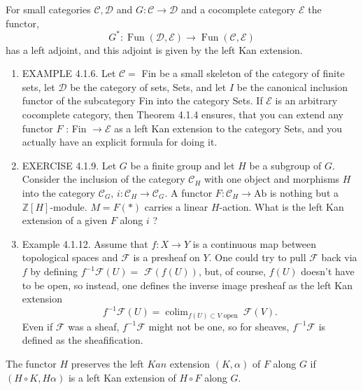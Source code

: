 \begin{example}
\begin{theo}
For small categories $\mathcal{C}, \mathcal{D}$ and $G: \mathcal{C} \rightarrow \mathcal{D}$ and a cocomplete category $\mathcal{E}$ the functor,
$$
G^*: \operatorname{Fun}(\mathcal{D}, \mathcal{E}) \rightarrow \operatorname{Fun}(\mathcal{C}, \mathcal{E})
$$
has a left adjoint, and this adjoint is given by the left Kan extension.
\end{theo}

\begin{example}
    \begin{enumerate}
        \item EXAMPLE 4.1.6. Let $\mathcal{C}=$ Fin be a small skeleton of the category of finite sets, let $\mathcal{D}$ be the category of sets, Sets, and let $I$ be the canonical inclusion functor of the subcategory Fin into the category Sets. If $\mathcal{E}$ is an arbitrary cocomplete category, then Theorem 4.1.4 ensures, that you can extend any functor $F$ : Fin $\rightarrow \mathcal{E}$ as a left Kan extension to the category Sets, and you actually have an explicit formula for doing it.
        \item EXERCISE 4.1.9. Let $G$ be a finite group and let $H$ be a subgroup of $G$. Consider the inclusion of the category $\mathcal{C}_H$ with one object and morphisms $H$ into the category $\mathcal{C}_G$, $i: \mathcal{C}_H \rightarrow \mathcal{C}_G$. A functor $F: \mathcal{C}_H \rightarrow \mathrm{Ab}$ is nothing but a $\mathbb{Z}[H]$-module. $M=F(*)$ carries a linear $H$-action. What is the left Kan extension of a given $F$ along $i$ ?
        \item Example 4.1.12. Assume that $f: X \rightarrow Y$ is a continuous map between topological spaces and $\mathcal{F}$ is a presheaf on $Y$. One could try to pull $\mathcal{F}$ back via $f$ by defining $f^{-1} \mathcal{F}(U)=$ $\mathcal{F}(f(U))$, but, of course, $f(U)$ doesn't have to be open, so instead, one defines the inverse image presheaf as the left Kan extension
        $$
        f^{-1} \mathcal{F}(U)=\operatorname{colim}_{f(U) \subset V \text { open }} \mathcal{F}(V) .
        $$
        Even if $\mathcal{F}$ was a sheaf, $f^{-1} \mathcal{F}$ might not be one, so for sheaves, $f^{-1} \mathcal{F}$ is defined as the sheafification.
    \end{enumerate}
\end{example}


The functor $H$ preserves the left $K a n$ extension $(K, \alpha)$ of $F$ along $G$ if $(H \circ K, H \alpha)$ is a left Kan extension of $H \circ F$ along $G$.


\end{example}
